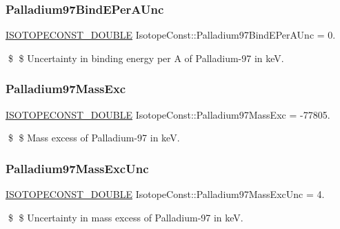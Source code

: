 \subsubsection{\texorpdfstring{Palladium97\+Bind\+E\+Per\+A\+Unc}{Palladium97BindEPerAUnc}}
{\footnotesize\ttfamily \mbox{\hyperlink{group___isotope_const-_macros_ga8f45a7272ce02c0b4c65c44636ed719a}{I\+S\+O\+T\+O\+P\+E\+C\+O\+N\+S\+T\+\_\+\+D\+O\+U\+B\+LE}} Isotope\+Const\+::\+Palladium97\+Bind\+E\+Per\+A\+Unc = 0.}

\$ \$ Uncertainty in binding energy per A of Palladium-\/97 in keV. \mbox{\label{group___isotope_const-_palladium-_pd97_ga6a670c4c345c8493e5beabf63b837b7d}} 
\subsubsection{\texorpdfstring{Palladium97\+Mass\+Exc}{Palladium97MassExc}}
{\footnotesize\ttfamily \mbox{\hyperlink{group___isotope_const-_macros_ga8f45a7272ce02c0b4c65c44636ed719a}{I\+S\+O\+T\+O\+P\+E\+C\+O\+N\+S\+T\+\_\+\+D\+O\+U\+B\+LE}} Isotope\+Const\+::\+Palladium97\+Mass\+Exc = -\/77805.}

\$ \$ Mass excess of Palladium-\/97 in keV. \mbox{\label{group___isotope_const-_palladium-_pd97_gaa3db39015dc64d067b769be482791927}} 
\subsubsection{\texorpdfstring{Palladium97\+Mass\+Exc\+Unc}{Palladium97MassExcUnc}}
{\footnotesize\ttfamily \mbox{\hyperlink{group___isotope_const-_macros_ga8f45a7272ce02c0b4c65c44636ed719a}{I\+S\+O\+T\+O\+P\+E\+C\+O\+N\+S\+T\+\_\+\+D\+O\+U\+B\+LE}} Isotope\+Const\+::\+Palladium97\+Mass\+Exc\+Unc = 4.}

\$ \$ Uncertainty in mass excess of Palladium-\/97 in keV. \mbox{\label{group___isotope_const-_palladium-_pd97_ga8d47e525a37dcfc2626d00e4da4ca7d3}} 
